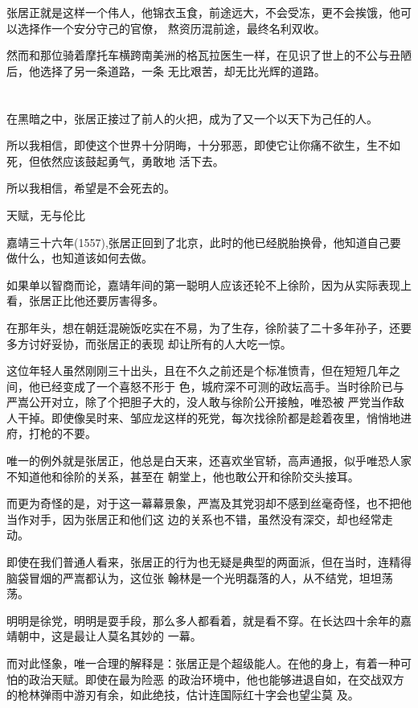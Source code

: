\documentclass[11pt,a4paper,onecolumn]{article}
\begin{document}
张居正就是这样一个伟人，他锦衣玉食，前途远大，不会受冻，更不会挨饿，他可以选择作一个安分守己的官僚，
熬资历混前途，最终名利双收。

然而和那位骑着摩托车横跨南美洲的格瓦拉医生一样，在见识了世上的不公与丑陋后，他选择了另一条道路，一条
无比艰苦，却无比光辉的道路。

\section[\thesection]{}

在黑暗之中，张居正接过了前人的火把，成为了又一个以天下为己任的人。

所以我相信，即使这个世界十分阴晦，十分邪恶，即使它让你痛不欲生，生不如死，但依然应该鼓起勇气，勇敢地
活下去。

所以我相信，希望是不会死去的。

天赋，无与伦比

嘉靖三十六年(1557),张居正回到了北京，此时的他已经脱胎换骨，他知道自己要做什么，也知道该如何去做。

如果单以智商而论，嘉靖年间的第一聪明人应该还轮不上徐阶，因为从实际表现上看，张居正比他还要厉害得多。

在那年头，想在朝廷混碗饭吃实在不易，为了生存，徐阶装了二十多年孙子，还要多方讨好妥协，而张居正的表现
却让所有的人大吃一惊。

这位年轻人虽然刚刚三十出头，且在不久之前还是个标准愤青，但在短短几年之间，他已经变成了一个喜怒不形于
色，城府深不可测的政坛高手。当时徐阶已与严嵩公开对立，除了个把胆子大的，没人敢与徐阶公开接触，唯恐被
严党当作敌人干掉。即使像吴时来、邹应龙这样的死党，每次找徐阶都是趁着夜里，悄悄地进府，打枪的不要。

唯一的例外就是张居正，他总是白天来，还喜欢坐官轿，高声通报，似乎唯恐人家不知道他和徐阶的关系，甚至在
朝堂上，他也敢公开和徐阶交头接耳。

而更为奇怪的是，对于这一幕幕景象，严嵩及其党羽却不感到丝毫奇怪，也不把他当作对手，因为张居正和他们这
边的关系也不错，虽然没有深交，却也经常走动。

即使在我们普通人看来，张居正的行为也无疑是典型的两面派，但在当时，连精得脑袋冒烟的严嵩都认为，这位张
翰林是一个光明磊落的人，从不结党，坦坦荡荡。

明明是徐党，明明是耍手段，那么多人都看着，就是看不穿。在长达四十余年的嘉靖朝中，这是最让人莫名其妙的
一幕。

而对此怪象，唯一合理的解释是：张居正是个超级能人。在他的身上，有着一种可怕的政治天赋。即使在最为险恶
的政治环境中，他也能够进退自如，在交战双方的枪林弹雨中游刃有余，如此绝技，估计连国际红十字会也望尘莫
及。
\end{document}
